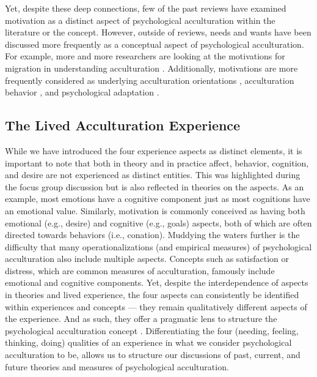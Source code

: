 \documentclass[man, 12pt, a4paper, mask]{apa7}
\begin{document}
Yet, despite these deep connections, few of the past reviews have examined motivation as a distinct aspect of psychological acculturation within the literature or the concept. However, outside of reviews, needs and wants have been discussed more frequently as a conceptual aspect of psychological acculturation. For example, more and more researchers are looking at the motivations for migration in understanding acculturation \citep{Sandu2018, Echterhoff2020}. Additionally, motivations are more frequently considered as underlying  acculturation orientations \citep{Recker2017a}, acculturation behavior \citep{Reece2000}, and psychological adaptation \citep{Safdar2003}. 

\subsection{The Lived Acculturation Experience}
While we have introduced the four experience aspects as distinct elements, it is important to note that both in theory and in practice affect, behavior, cognition, and desire are not experienced as distinct entities. This was highlighted during the focus group discussion but is also reflected in theories on the aspects. As an example, most emotions have a cognitive component just as most cognitions have an emotional value. Similarly, motivation is commonly conceived as having both emotional (e.g., desire) and cognitive (e.g., goals) aspects, both of which are often directed towards behaviors (i.e., conation). Muddying the waters further is the difficulty that many operationalizations (and empirical measures) of psychological acculturation also include multiple aspects. Concepts such as satisfaction or distress, which are common measures of acculturation, famously include emotional and cognitive components.  Yet, despite the interdependence of aspects in theories and lived experience, the four aspects can consistently be identified within experiences and concepts --- they remain qualitatively different aspects of the experience. And as such, they offer a pragmatic lens to structure the psychological acculturation concept \citep{Kuhn1962}. Differentiating the four (needing, feeling, thinking, doing) qualities of an experience in what we consider psychological acculturation to be, allows us to structure our discussions of past, current, and future theories and measures of psychological acculturation.
\end{document}
